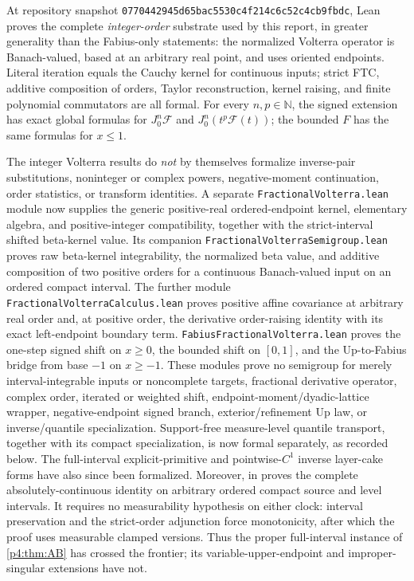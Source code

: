 \documentclass[11pt,oneside]{article}
\theoremstyle{definition}
\theoremstyle{remark}
\newcommand{\F}{F}
\newcommand{\N}{\mathbb N}
\newcommand{\1}{\mathbf 1}
\begin{document}
\begin{statusbox}
At repository snapshot
\texttt{0770442945d65bac5530c4f214c6c52c4cb9fbdc}, Lean proves the complete
\emph{integer-order} substrate used by this report, in greater generality than the
Fabius-only statements: the normalized Volterra operator is Banach-valued, based at an
arbitrary real point, and uses oriented endpoints.  Literal iteration equals the Cauchy
kernel for continuous inputs; strict FTC, additive composition of orders, Taylor
reconstruction, kernel raising, and finite polynomial commutators are all formal.
For every \(n,p\in\N\), the signed extension has exact global formulas for
\(J_0^n\mathcal F\) and \(J_0^n(t^p\mathcal F(t))\); the bounded \(\F\) has the same
formulas for \(x\le1\).

The integer Volterra results do \emph{not} by themselves formalize inverse-pair
substitutions, noninteger or complex powers, negative-moment continuation, order statistics,
or transform identities.  A separate \texttt{FractionalVolterra.lean} module now supplies
the generic positive-real ordered-endpoint kernel, elementary algebra, and positive-integer
compatibility, together with the strict-interval shifted beta-kernel value.  Its companion
\texttt{FractionalVolterraSemigroup.lean} proves raw beta-kernel integrability, the
normalized beta value, and additive composition of two positive orders for a continuous
Banach-valued input on an ordered compact interval.  The further module
\texttt{FractionalVolterraCalculus.lean} proves positive affine covariance at arbitrary
real order and, at positive order, the derivative order-raising identity with its exact
left-endpoint boundary term.  \texttt{FabiusFractionalVolterra.lean} proves the one-step
signed shift on $x\ge0$, the bounded shift on \([0,1]\), and the Up-to-Fabius bridge from
base $-1$ on $x\ge-1$.  These modules prove no semigroup for merely interval-integrable
inputs or noncomplete targets, fractional derivative operator, complex order, iterated or
weighted shift, endpoint-moment/dyadic-lattice wrapper, negative-endpoint signed branch,
exterior/refinement Up law, or inverse/quantile specialization.
Support-free
measure-level quantile transport, together with its compact specialization, is now formal
separately, as recorded below.  The full-interval explicit-primitive and pointwise-\(C^1\)
inverse layer-cake forms have also since been formalized.  Moreover,
 in
 proves the complete absolutely-continuous identity on
arbitrary ordered compact source and level intervals.  It requires no measurability
hypothesis on either clock: interval preservation and the strict-order adjunction force
monotonicity, after which the proof uses measurable clamped  versions.
Thus the proper full-interval instance of \cref{p4:thm:AB} has crossed the frontier; its
variable-upper-endpoint and improper-singular extensions have not.
\end{statusbox}
\end{document}
